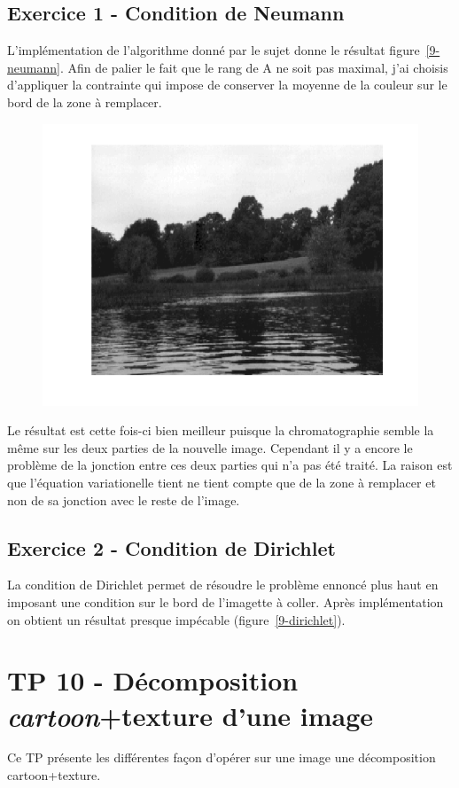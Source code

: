 \documentclass{article}
\begin{document}
\subsection{Exercice 1 - Condition de Neumann}
L'implémentation de l'algorithme donné par le sujet donne le résultat figure~\ref{9-neumann}. Afin de palier le fait que le rang de A ne soit pas maximal, j'ai choisis d'appliquer la contrainte qui impose de conserver la moyenne de la couleur sur le bord de la zone à remplacer.

\begin{figure}[!ht]
\includegraphics[width=\textwidth]{images/1/1-1-autumn_b.png}
\end{figure}

Le résultat est cette fois-ci bien meilleur puisque la chromatographie semble la même sur les deux parties de la nouvelle image. Cependant il y a encore le problème de la jonction entre ces deux parties qui n'a pas été traité. La raison est que l'équation variationelle tient ne tient compte que de la zone à remplacer et non de sa jonction avec le reste de l'image.

\subsection{Exercice 2 - Condition de Dirichlet}
La condition de Dirichlet permet de résoudre le problème ennoncé plus haut en imposant une condition sur le bord de l'imagette à coller. Après implémentation on obtient un résultat presque impécable (figure~\ref{9-dirichlet}).


\section{TP 10 - Décomposition \emph{cartoon}+texture d'une image}
Ce TP présente les différentes façon d'opérer sur une image une décomposition cartoon+texture.
\end{document}
